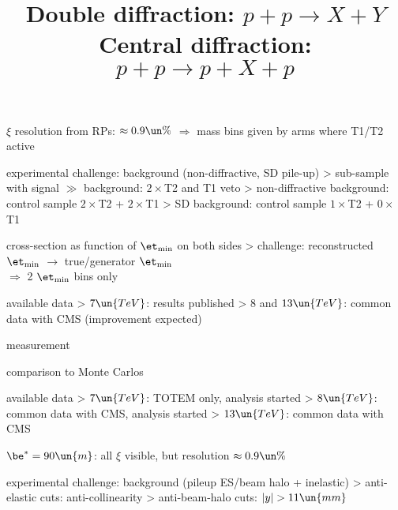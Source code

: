 \> $\xi$ resolution from RPs: $\approx 0.9\un{\%}$ $\Rightarrow$ mass bins given by arms where T1/T2 active

\newpage %

\centerline{}

\newpage %
\title{Double diffraction: $p + p \rightarrow X + Y$}

\centerline{}

\> experimental challenge: background (non-diffractive, SD pile-up)
\>> sub-sample with signal $\gg$ background:  $2\times$T2 and T1 veto
\>> non-diffractive background: control sample $2\times$T2 + $2\times$T1
\>> SD background: control sample $1\times$T2 + $0\times$T1

\> cross-section as function of $\et_{\rm min}$ on both sides
\>> challenge: reconstructed $\et_{\rm min}$ $\longrightarrow$ true/generator $\et_{\rm min}$\\
$\Rightarrow$ 2 $\et_{\rm min}$ bins only

\> available data
\>> $7\un{TeV}$: results published
\>> $8$ and $13\un{TeV}$: common data with CMS (improvement expected)

\newpage %

\> measurement

\centerline{}

\> comparison to Monte Carlos

\centerline{}

\newpage %
\title{Central diffraction: $p + p \rightarrow p + X + p$}

\centerline{}

\> available data
\>> $7\un{TeV}$: TOTEM only, analysis started
\>> $8\un{TeV}$: common data with CMS, analysis started
\>> $13\un{TeV}$: common data with CMS

\> $\be^* = 90\un{m}$: all $\xi$ visible, but resolution $\approx 0.9\un{\%}$

\> experimental challenge: background (pileup ES/beam halo + inelastic)
\>> anti-elastic cuts: anti-collinearity
\>> anti-beam-halo cuts: $|y| > 11\un{mm}$

